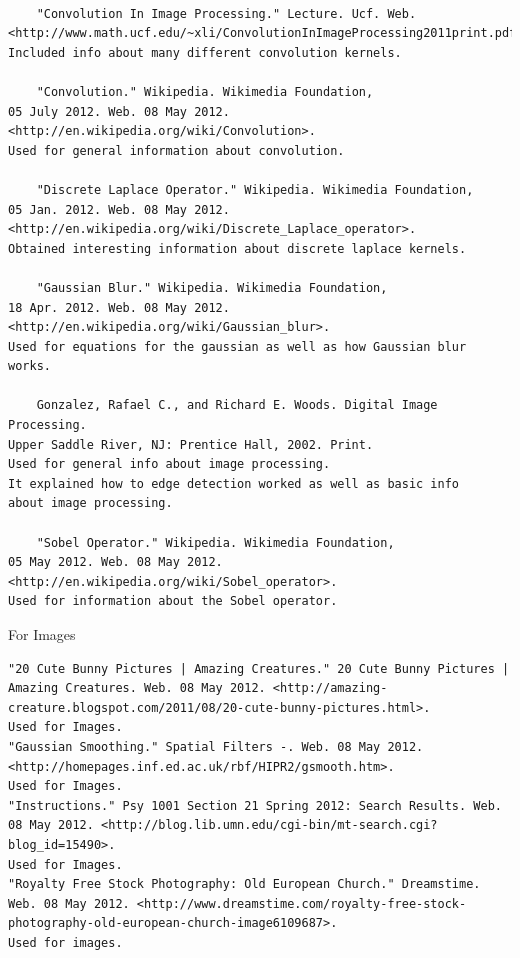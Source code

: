 \documentclass[11pt]{article}
\begin{document}
\begin{lstlisting}

	"Convolution In Image Processing." Lecture. Ucf. Web.
<http://www.math.ucf.edu/~xli/ConvolutionInImageProcessing2011print.pdf>.
Included info about many different convolution kernels.

	"Convolution." Wikipedia. Wikimedia Foundation, 
05 July 2012. Web. 08 May 2012. 
<http://en.wikipedia.org/wiki/Convolution>.
Used for general information about convolution.

	"Discrete Laplace Operator." Wikipedia. Wikimedia Foundation,
05 Jan. 2012. Web. 08 May 2012.
<http://en.wikipedia.org/wiki/Discrete_Laplace_operator>.
Obtained interesting information about discrete laplace kernels.

	"Gaussian Blur." Wikipedia. Wikimedia Foundation,
18 Apr. 2012. Web. 08 May 2012.
<http://en.wikipedia.org/wiki/Gaussian_blur>.
Used for equations for the gaussian as well as how Gaussian blur works.

	Gonzalez, Rafael C., and Richard E. Woods. Digital Image Processing.
Upper Saddle River, NJ: Prentice Hall, 2002. Print.
Used for general info about image processing.
It explained how to edge detection worked as well as basic info
about image processing.

	"Sobel Operator." Wikipedia. Wikimedia Foundation,
05 May 2012. Web. 08 May 2012.
<http://en.wikipedia.org/wiki/Sobel_operator>.
Used for information about the Sobel operator.
\end{lstlisting}

For Images
\begin{lstlisting}
"20 Cute Bunny Pictures | Amazing Creatures." 20 Cute Bunny Pictures | Amazing Creatures. Web. 08 May 2012. <http://amazing-creature.blogspot.com/2011/08/20-cute-bunny-pictures.html>.
Used for Images.
"Gaussian Smoothing." Spatial Filters -. Web. 08 May 2012. <http://homepages.inf.ed.ac.uk/rbf/HIPR2/gsmooth.htm>.
Used for Images.
"Instructions." Psy 1001 Section 21 Spring 2012: Search Results. Web. 08 May 2012. <http://blog.lib.umn.edu/cgi-bin/mt-search.cgi?blog_id=15490>.
Used for Images.
"Royalty Free Stock Photography: Old European Church." Dreamstime. Web. 08 May 2012. <http://www.dreamstime.com/royalty-free-stock-photography-old-european-church-image6109687>.
Used for images.
\end{lstlisting}



	
\end{document}
